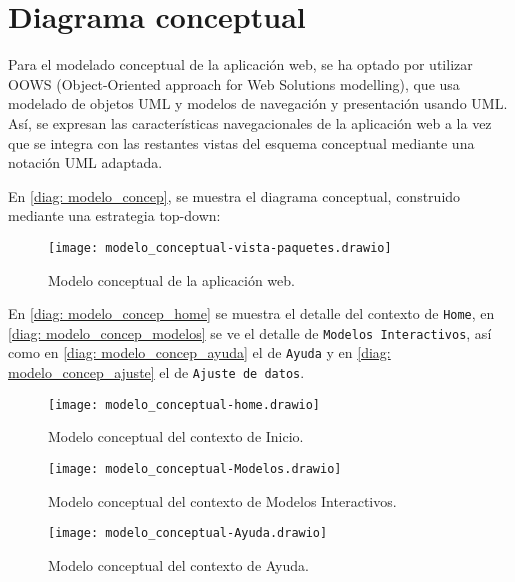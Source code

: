 \section{Diagrama conceptual}

Para el modelado conceptual de la aplicación web, se ha optado por utilizar OOWS (Object-Oriented approach for Web Solutions modelling), que usa modelado de objetos UML y modelos de navegación y presentación usando UML. Así, se expresan las características navegacionales de la aplicación web a la vez que se integra con las restantes vistas del esquema conceptual mediante una notación UML adaptada.

En \eqref{diag: modelo_concep}, se muestra el diagrama conceptual, construido mediante una estrategia top-down:

\begin{figure}[!h]
\begin{center}
\caption{Modelo conceptual de la aplicación web.}
\label{diag: modelo_concep}
\texttt{[image: modelo\_conceptual-vista-paquetes.drawio]}
\end{center}
\end{figure}

En \eqref{diag: modelo_concep_home} se muestra el detalle del contexto de \verb|Home|, en \eqref{diag: modelo_concep_modelos} se ve el detalle de \verb|Modelos Interactivos|, así como en \eqref{diag: modelo_concep_ayuda} el de \verb|Ayuda| y en \eqref{diag: modelo_concep_ajuste} el de \verb|Ajuste de datos|.

\begin{figure}[!h]
\begin{center}
\caption{Modelo conceptual del contexto de Inicio.}
\label{diag: modelo_concep_home}
\texttt{[image: modelo\_conceptual-home.drawio]}
\end{center}
\end{figure}

\begin{figure}[!h]
\begin{center}
\caption{Modelo conceptual del contexto de Modelos Interactivos.}
\label{diag: modelo_concep_modelos}
\texttt{[image: modelo\_conceptual-Modelos.drawio]}
\end{center}
\end{figure}

\begin{figure}[!h]
\begin{center}
\caption{Modelo conceptual del contexto de Ayuda.}
\label{diag: modelo_concep_ayuda}
\texttt{[image: modelo\_conceptual-Ayuda.drawio]}
\end{center}
\end{figure}

